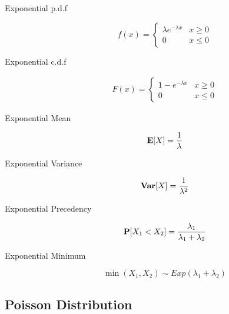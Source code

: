 \begin{description}
	
	\item [Exponential p.d.f]	
		\begin{equation}
		f(x) = \left\{\begin{matrix}
		\lambda e^{-\lambda x} & x \geq 0\\ 
		0 & x \leq 0
		\end{matrix}\right.
		\end{equation}
	
	\item [Exponential c.d.f]	
		\begin{equation}
		\begin{aligned}
		F(x) =  
		\left\{\begin{matrix}
		1 - e^{-\lambda x} & x \geq 0\\ 
		0 & x \leq 0
		\end{matrix}\right.
		\end{aligned}
		\end{equation}
	
	\item [Exponential Mean]	
		\begin{equation}
		\mathbf{E}[X] = \frac{1}{\lambda}
		\end{equation}	
	
	\item [Exponential Variance]	
		\begin{equation}
		\mathbf{Var}[X] = \frac{1}{\lambda^{2}}
		\end{equation}	
	
	\item [Exponential Precedency]	
		\begin{equation}
		\mathbf{P}[X_{1} < X_{2}] = \frac{\lambda_{1}}{\lambda_{1} + \lambda_{2}}
		\end{equation}
	
	\item [Exponential Minimum]	
		\begin{equation}
		\min(X_{1},X_{2}) \sim Exp(\lambda_{1} + \lambda_{2})
		\end{equation}

\end{description}




\subsection{Poisson Distribution}

